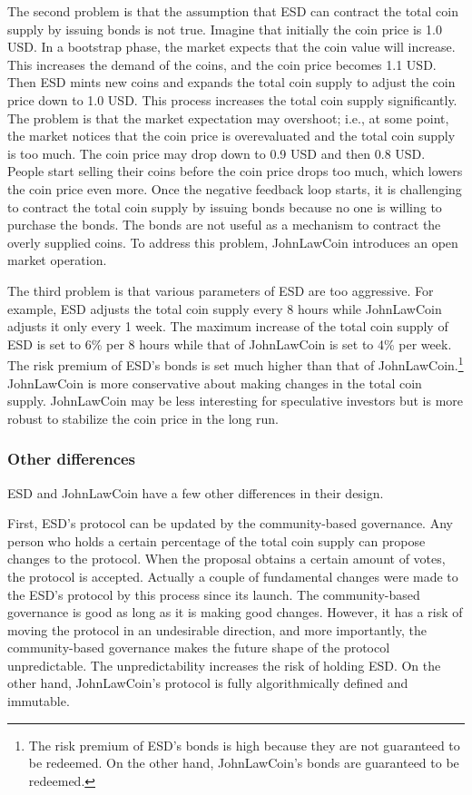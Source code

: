 \documentclass[dvipdfmx,a4paper]{article}
\begin{document}
The second problem is that the assumption that ESD can contract the total coin supply by issuing bonds is not true. Imagine that initially the coin price is 1.0 USD. In a bootstrap phase, the market expects that the coin value will increase. This increases the demand of the coins, and the coin price becomes 1.1 USD. Then ESD mints new coins and expands the total coin supply to adjust the coin price down to 1.0 USD. This process increases the total coin supply significantly. The problem is that the market expectation may overshoot; i.e., at some point, the market notices that the coin price is overevaluated and the total coin supply is too much. The coin price may drop down to 0.9 USD and then 0.8 USD. People start selling their coins before the coin price drops too much, which lowers the coin price even more. Once the negative feedback loop starts, it is challenging to contract the total coin supply by issuing bonds because no one is willing to purchase the bonds. The bonds are not useful as a mechanism to contract the overly supplied coins. To address this problem, JohnLawCoin introduces an open market operation.

The third problem is that various parameters of ESD are too aggressive. For example, ESD adjusts the total coin supply every 8 hours while JohnLawCoin adjusts it only every 1 week. The maximum increase of the total coin supply of ESD is set to 6\% per 8 hours while that of JohnLawCoin is set to 4\% per week. The risk premium of ESD's bonds is set much higher than that of JohnLawCoin.\footnote{The risk premium of ESD's bonds is high because they are not guaranteed to be redeemed. On the other hand, JohnLawCoin's bonds are guaranteed to be redeemed.} JohnLawCoin is more conservative about making changes in the total coin supply. JohnLawCoin may be less interesting for speculative investors but is more robust to stabilize the coin price in the long run.

\subsubsection{Other differences}

ESD and JohnLawCoin have a few other differences in their design.

First, ESD's protocol can be updated by the community-based governance. Any person who holds a certain percentage of the total coin supply can propose changes to the protocol. When the proposal obtains a certain amount of votes, the protocol is accepted. Actually a couple of fundamental changes were made to the ESD's protocol by this process since its launch. The community-based governance is good as long as it is making good changes. However, it has a risk of moving the protocol in an undesirable direction, and more importantly, the community-based governance makes the future shape of the protocol unpredictable. The unpredictability increases the risk of holding ESD. On the other hand, JohnLawCoin's protocol is fully algorithmically defined and immutable.
\end{document}
